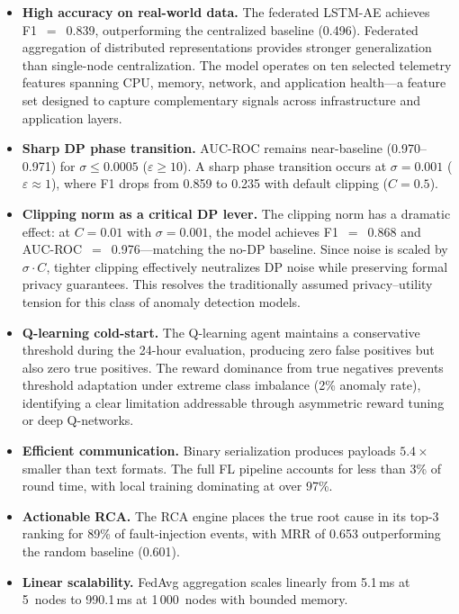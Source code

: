 \begin{itemize}
    \item \textbf{High accuracy on real-world data.} The federated LSTM-AE
    achieves F1~$=$~0.839, outperforming the centralized baseline (0.496).
    Federated aggregation of distributed representations provides stronger
    generalization than single-node centralization. The model operates on
    ten selected telemetry features spanning CPU, memory, network, and
    application health---a feature set designed to capture complementary
    signals across infrastructure and application layers.

    \item \textbf{Sharp DP phase transition.} AUC-ROC remains near-baseline
    (0.970--0.971) for $\sigma \leq 0.0005$ ($\varepsilon \geq 10$). A sharp
    phase transition occurs at $\sigma{=}0.001$ ($\varepsilon \approx 1$),
    where F1 drops from 0.859 to 0.235 with default clipping ($C{=}0.5$).

    \item \textbf{Clipping norm as a critical DP lever.} The clipping
    norm has a dramatic effect: at $C{=}0.01$ with $\sigma{=}0.001$,
    the model achieves F1~$=$~0.868 and AUC-ROC~$=$~0.976---matching
    the no-DP baseline. Since noise is scaled by $\sigma \cdot C$, tighter
    clipping effectively neutralizes DP noise while preserving formal privacy
    guarantees. This resolves the traditionally assumed privacy--utility
    tension for this class of anomaly detection models.

    \item \textbf{Q-learning cold-start.} The Q-learning agent maintains a
    conservative threshold during the 24-hour evaluation, producing zero false
    positives but also zero true positives. The reward dominance from true
    negatives prevents threshold adaptation under extreme class imbalance (2\%
    anomaly rate), identifying a clear limitation addressable through
    asymmetric reward tuning or deep Q-networks.

    \item \textbf{Efficient communication.} Binary serialization produces
    payloads $5.4\times$ smaller than text formats. The full FL pipeline
    accounts for less than 3\% of round time, with local training dominating
    at over 97\%.

    \item \textbf{Actionable RCA.} The RCA engine places the true root cause
    in its top-3 ranking for 89\% of fault-injection events, with MRR of
    0.653 outperforming the random baseline (0.601).

    \item \textbf{Linear scalability.} FedAvg aggregation scales linearly
    from 5.1\,ms at 5~nodes to 990.1\,ms at 1\,000~nodes with bounded memory.
\end{itemize}

